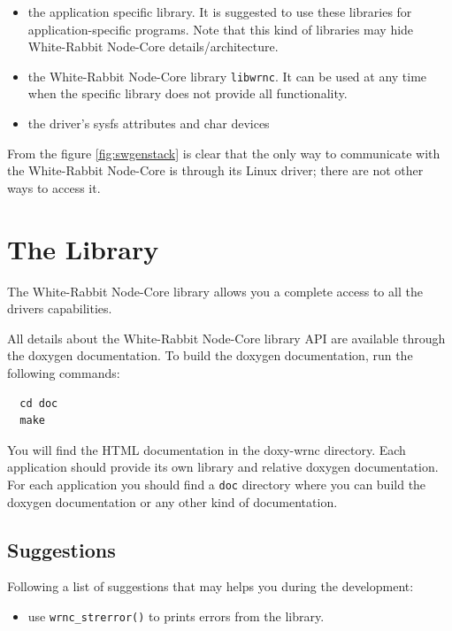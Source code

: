 \documentclass[a4paper,10pt]{article}
\begin{document}
\begin{itemize}
  \item the application specific library. It is suggested to use these
    libraries for application-specific programs. Note that this kind of
    libraries may hide White-Rabbit Node-Core details/architecture.
  \item the White-Rabbit Node-Core library \texttt{libwrnc}. It can be
    used at any time when the specific library does not provide all
    functionality.
  \item the driver's sysfs attributes and char devices
\end{itemize}

From the figure \ref{fig:swgenstack} is clear that the only way to
communicate with the White-Rabbit Node-Core is through its Linux
driver; there are not other ways to access it.



\section{The Library}%
The White-Rabbit Node-Core library allows you a complete access to 
all the drivers capabilities.

All details about the White-Rabbit Node-Core library API are
available through the doxygen documentation. To build the doxygen
documentation, run the following commands:

\begin{verbatim}
  cd doc
  make
\end{verbatim}

You will find the HTML documentation in the doxy-wrnc directory. Each
application should provide its own library and relative doxygen
documentation. For each application you should find a \texttt{doc}
directory where you can build the doxygen documentation or any other
kind of documentation.

\subsection{Suggestions}%
Following a list of suggestions that may helps you during the 
development:

\begin{itemize}
 \item use \texttt{wrnc\_strerror()} to prints errors from the 
library.
\end{itemize}
\end{document}
